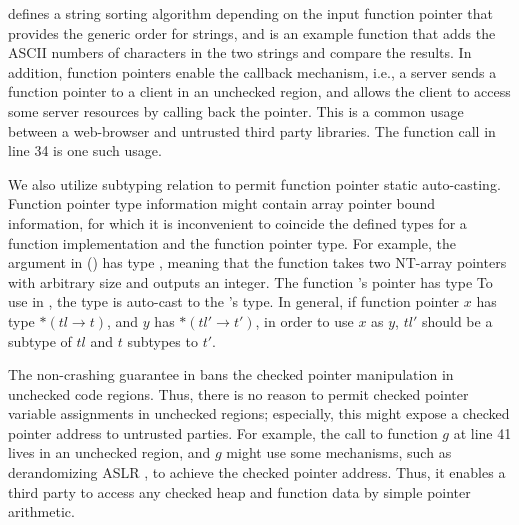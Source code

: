  defines a string sorting algorithm
depending on the input function pointer  that provides the generic order for strings,
and  is an example  function
that adds the ASCII numbers of characters in the two strings and compare the results.
In addition, function pointers enable the callback mechanism,
i.e., a server sends a function pointer to a client in an unchecked region,
and allows the client to access some server resources by calling back the pointer.
This is a common usage between a web-browser and untrusted third party libraries.
The function call in  line 34 is one such usage.

We also utilize \systemname subtyping relation to permit function pointer static auto-casting.
Function pointer type information might contain array pointer bound information,
for which it is inconvenient to coincide the defined types for a function implementation and the function pointer type. 
For example, the  argument in  ()
has type ,
meaning that the function takes two NT-array pointers with arbitrary size and outputs an integer.
The function 's pointer has type 
To use  in , the type is auto-cast to the 's type.
In general, if function pointer $x$ has type $* (tl \to t)$, and  $y$ has $* (tl' \to t')$,
in order to use $x$ as $y$, $tl'$ should be a subtype of $tl$ and $t$ subtypes to $t'$.

The non-crashing guarantee in \systemname bans the checked pointer manipulation in unchecked code regions.
Thus, there is no reason to permit checked pointer variable assignments in unchecked regions;
especially, this might expose a checked pointer address to untrusted parties.
For example, the call to function $g$ at  line 41 lives in an unchecked region,
and $g$ might use some mechanisms, such as derandomizing ASLR \cite{shacham-aslr},
to achieve the checked pointer address.
Thus, it enables a third party to access any checked heap and function data by simple pointer arithmetic.

